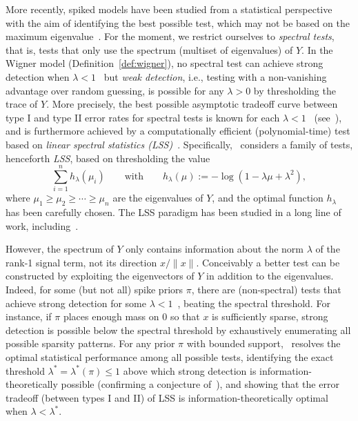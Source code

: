 \documentclass[11pt]{article}
\begin{document}
More recently, spiked models have been studied from a statistical perspective with the aim of identifying the best possible test, which may not be based on the maximum eigenvalue~\cite{sphericity,sphericity-2,MRZ,LKZ-sparse,BMVVX,opt-subopt,fund-limits-wigner,weak-wigner,det-rect}. For the moment, we restrict ourselves to \emph{spectral tests}, that is, tests that only use the spectrum (multiset of eigenvalues) of $Y$. In the Wigner model (Definition~\ref{def:wigner}), no spectral test can achieve strong detection when $\lambda < 1$~\cite{MRZ} but \emph{weak detection}, i.e., testing with a non-vanishing advantage over random guessing, is possible for any $\lambda > 0$ by thresholding the trace of $Y$. More precisely, the best possible asymptotic tradeoff curve between type I and type II error rates for spectral tests is known for each $\lambda < 1$~\cite{BL-free-1,BL-free-2} (see~\cite{weak-wigner}), and is furthermore achieved by a computationally efficient (polynomial-time) test based on \emph{linear spectral statistics (LSS)}~\cite{weak-wigner}. Specifically,~\cite{weak-wigner} considers a family of tests, henceforth \emph{LSS}, based on thresholding the value
\begin{equation}\label{eq:lss}
\sum_{i=1}^n h_\lambda(\mu_i) \qquad \text{with} \qquad h_\lambda(\mu) := -\log(1 - \lambda \mu + \lambda^2),
\end{equation}
where $\mu_1 \ge \mu_2 \ge \cdots \ge \mu_n$ are the eigenvalues of $Y$, and the optimal function $h_\lambda$ has been carefully chosen. The LSS paradigm has been studied in a long line of work, including~\cite{clt-wishart,clt-band,clt-wigner,BL-free-1,banerjee-ma,weak-wigner,weak-wigner-general-rank,det-rect,lss-block,lss-div-spikes}.

However, the spectrum of $Y$ only contains information about the norm $\lambda$ of the rank-1 signal term, not its direction $x/\|x\|$. Conceivably a better test can be constructed by exploiting the eigenvectors of $Y$ in addition to the eigenvalues. Indeed, for some (but not all) spike priors $\pi$, there are (non-spectral) tests that achieve strong detection for some $\lambda < 1$~\cite{BMVVX,opt-subopt}, beating the spectral threshold. For instance, if $\pi$ places enough mass on $0$ so that $x$ is sufficiently sparse, strong detection is possible below the spectral threshold by exhaustively enumerating all possible sparsity patterns. For any prior $\pi$ with bounded support,~\cite{fund-limits-wigner} resolves the optimal statistical performance among all possible tests, identifying the exact threshold $\lambda^* = \lambda^*(\pi) \le 1$ above which strong detection is information-theoretically possible (confirming a conjecture of~\cite{LKZ-sparse}), and showing that the error tradeoff (between types I and II) of LSS is information-theoretically optimal when $\lambda < \lambda^*$.
\end{document}
